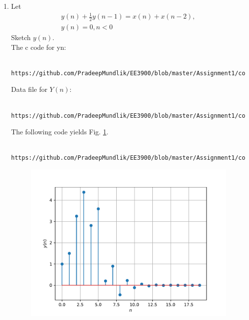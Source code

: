 \documentclass[journal,12pt,twocolumn]{IEEEtran}
\renewcommand\thesection{\arabic{section}}
\begin{document}
\begin{enumerate}[label=\thesection.\arabic*,ref=\thesection.\theenumi]
\item Let
\begin{multline}
\label{eq:iir_filter}
y(n) + \frac{1}{2}y(n-1) = x(n) + x(n-2), 
\\
 y(n) = 0, n < 0
\end{multline}
Sketch $y(n)$.
\\
\solution 
The c code for yn:
\begin{lstlisting}
     https://github.com/PradeepMundlik/EE3900/blob/master/Assignment1/codes/q3/yn.c
\end{lstlisting}
Data file for $Y(n)$:
\begin{lstlisting}
     https://github.com/PradeepMundlik/EE3900/blob/master/Assignment1/codes/q3/yn.dat
\end{lstlisting}
The following code yields Fig. \ref{fig:yn}.
\begin{lstlisting}
     https://github.com/PradeepMundlik/EE3900/blob/master/Assignment1/codes/q3/yn.py
\end{lstlisting}
\begin{figure}[!ht]
\begin{center}
\includegraphics[width=\columnwidth]{figs/q3/yn.pdf}
\end{center}
\label{fig:yn}	
\end{figure}
\end{enumerate}
\end{document}
